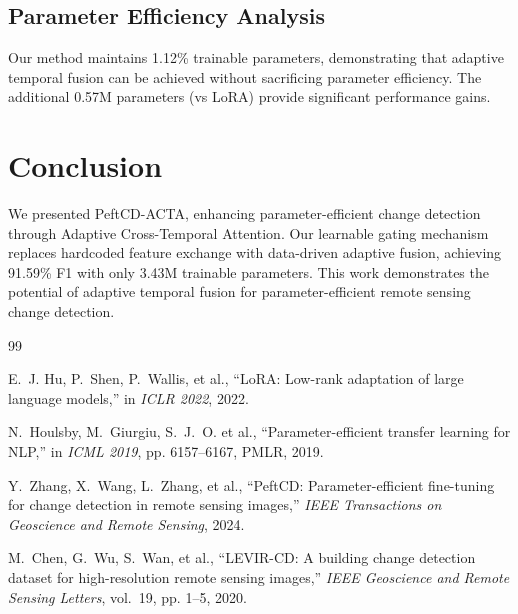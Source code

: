\documentclass{IEEEtran}
\begin{document}
\subsection{Parameter Efficiency Analysis}

Our method maintains 1.12\% trainable parameters, demonstrating that adaptive temporal fusion can be achieved without sacrificing parameter efficiency. The additional 0.57M parameters (vs LoRA) provide significant performance gains.

\section{Conclusion}
\label{sec:conclusion}

We presented PeftCD-ACTA, enhancing parameter-efficient change detection through Adaptive Cross-Temporal Attention. Our learnable gating mechanism replaces hardcoded feature exchange with data-driven adaptive fusion, achieving 91.59\% F1 with only 3.43M trainable parameters. This work demonstrates the potential of adaptive temporal fusion for parameter-efficient remote sensing change detection.

\begin{thebibliography}{99}

E.~J. Hu, P.~Shen, P.~Wallis, et al., ``LoRA: Low-rank adaptation of large language models,'' in \textit{ICLR 2022}, 2022.

N.~Houlsby, M.~Giurgiu, S.~J.~O. et al., ``Parameter-efficient transfer learning for NLP,'' in \textit{ICML 2019}, pp. 6157--6167, PMLR, 2019.

Y.~Zhang, X.~Wang, L.~Zhang, et al., ``PeftCD: Parameter-efficient fine-tuning for change detection in remote sensing images,'' \textit{IEEE Transactions on Geoscience and Remote Sensing}, 2024.

M.~Chen, G.~Wu, S.~Wan, et al., ``LEVIR-CD: A building change detection dataset for high-resolution remote sensing images,'' \textit{IEEE Geoscience and Remote Sensing Letters}, vol.~19, pp. 1--5, 2020.

\end{thebibliography}
\end{document}
